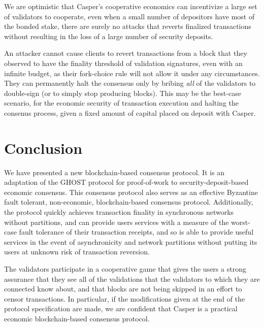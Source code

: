\documentclass[11pt,a4paper]{article}
\begin{document}
We are optimistic that Casper's cooperative economics can incentivize a large set of validators to cooperate, even when a small number of depositors have most of the bonded stake, there are surely no attacks that reverts finalized transactions without resulting in the loss of a large number of security deposits.

An attacker cannot cause clients to revert transactions from a block that they observed to have the finality threshold of validation signatures, even with an infinite budget, as their fork-choice rule will not allow it under any circumstances. They can permanently halt the consensus only by bribing \emph{all} of the validators to double-sign (or to simply stop producing blocks). This may be the best-case scenario, for the economic security of transaction execution and halting the consenus process, given a fixed amount of capital placed on deposit with Casper.


\section{Conclusion}

We have presented a new blockchain-based consensus protocol. It is an adaptation of the GHOST protocol for proof-of-work to security-deposit-based economic consensus. This consensus protocol also serves as an effective Byzantine fault tolerant, non-economic, blockchain-based consensus protocol. Additionally, the protocol quickly achieves transaction finality in synchronous networks without partitions, and can provide users services with a measure of the worst-case fault tolerance of their transaction receipts, and so is able to provide useful services in the event of asynchronicity and network partitions without putting its users at unknown risk of transaction reversion. 

The validators participate in a cooperative game that gives the users a strong assurance that they see all of the validations that the validators to which they are connected know about, and that blocks are not being skipped in an effort to censor transactions. In particular, if the modifications given at the end of the protocol specification are made, we are confident that Casper is a practical economic blockchain-based consensus protocol.



\end{document}
